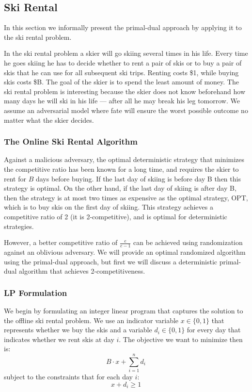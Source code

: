 \subsection{Ski Rental}

In this section we informally present the primal-dual approach by applying it to the ski rental problem.

In the ski rental problem a skier will go skiing several times in his life.
Every time he goes skiing he has to decide whether to rent a pair of skis or to buy a pair of skis that he can use for all subsequent ski trips.
Renting costs \$1, while buying skis costs \$B.
The goal of the skier is to spend the least amount of money.
The ski rental problem is interesting because the skier does not know beforehand how many days he will ski in his life --- after all he may break his leg tomorrow.
We assume an adversarial model where fate will ensure the worst possible outcome no matter what the skier decides.

\subsubsection{The Online Ski Rental Algorithm}
Against a malicious adversary, the optimal deterministic strategy that minimizes the competitive ratio has been known for a long time, and requires the skier to rent for $B$ days before buying.
If the last day of skiing is before day B then this strategy is optimal.
On the other hand, if the last day of skiing is after day B, then the strategy is at most two times as expensive as the optimal strategy, OPT, which is to buy skis on the first day of skiing.
This strategy achieves a competitive ratio of 2 (it is 2-competitive), and is optimal for deterministic strategies.

However, a better competitive ratio of $\frac{e}{e-1}$ can be achieved using randomization against an oblivious adversary.
We will provide an optimal randomized algorithm using the primal-dual approach, but first we will discuss a deterministic primal-dual algorithm that achieves 2-competitiveness.

\subsubsection{LP Formulation}
We begin by formulating an integer linear program that captures the solution to the offline ski rental problem.
We use an indicator variable $x \in \{0,1\}$ that represents whether we buy the skis and a variable $d_i \in \{0,1\}$ for every day that indicates whether we rent skis at day $i$. 
The objective we want to minimize then is:
\[ B\cdot x + \sum^n_{i=1} d_i \]
subject to the constraints that for each day $i$:
\[ x + d_i \ge 1 \]

